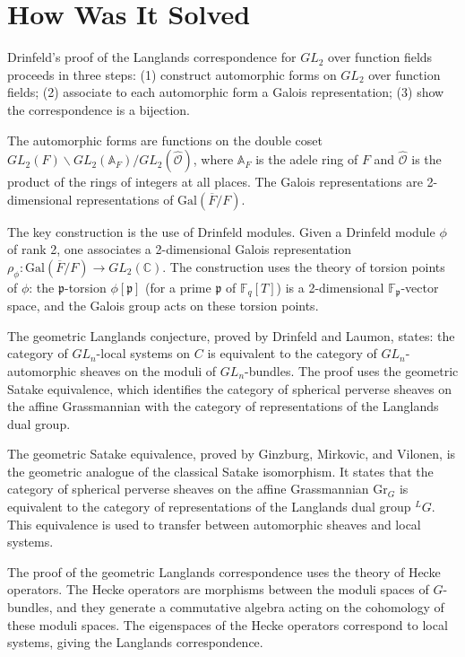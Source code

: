 \section{How Was It Solved}

Drinfeld's proof of the Langlands correspondence for $GL_2$ over function fields proceeds in three steps: (1) construct automorphic forms on $GL_2$ over function fields; (2) associate to each automorphic form a Galois representation; (3) show the correspondence is a bijection.

The automorphic forms are functions on the double coset $GL_2(F) \backslash GL_2(\mathbb{A}_F) / GL_2(\hat{\mathcal{O}})$, where $\mathbb{A}_F$ is the adele ring of $F$ and $\hat{\mathcal{O}}$ is the product of the rings of integers at all places. The Galois representations are 2-dimensional representations of $\text{Gal}(\overline{F}/F)$.

The key construction is the use of Drinfeld modules. Given a Drinfeld module $\phi$ of rank 2, one associates a 2-dimensional Galois representation $\rho_\phi: \text{Gal}(\overline{F}/F) \to GL_2(\mathbb{C})$. The construction uses the theory of torsion points of $\phi$: the $\mathfrak{p}$-torsion $\phi[\mathfrak{p}]$ (for a prime $\mathfrak{p}$ of $\mathbb{F}_q[T]$) is a 2-dimensional $\mathbb{F}_\mathfrak{p}$-vector space, and the Galois group acts on these torsion points.

The geometric Langlands conjecture, proved by Drinfeld and Laumon, states: the category of $GL_n$-local systems on $C$ is equivalent to the category of $GL_n$-automorphic sheaves on the moduli of $GL_n$-bundles. The proof uses the geometric Satake equivalence, which identifies the category of spherical perverse sheaves on the affine Grassmannian with the category of representations of the Langlands dual group.

The geometric Satake equivalence, proved by Ginzburg, Mirkovic, and Vilonen, is the geometric analogue of the classical Satake isomorphism. It states that the category of spherical perverse sheaves on the affine Grassmannian $\text{Gr}_G$ is equivalent to the category of representations of the Langlands dual group ${}^LG$. This equivalence is used to transfer between automorphic sheaves and local systems.

The proof of the geometric Langlands correspondence uses the theory of Hecke operators. The Hecke operators are morphisms between the moduli spaces of $G$-bundles, and they generate a commutative algebra acting on the cohomology of these moduli spaces. The eigenspaces of the Hecke operators correspond to local systems, giving the Langlands correspondence.

